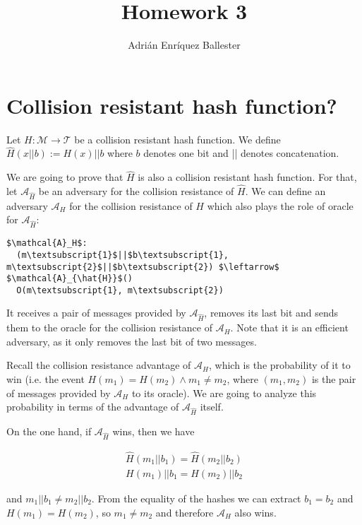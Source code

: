 \documentclass{article}
\title{Homework 3}
\author{Adrián Enríquez Ballester}
\begin{document}
\maketitle

\section{Collision resistant hash function?}

Let $H: \mathcal{M} \rightarrow \mathcal{T}$ be a collision resistant 
hash function. We define $\hat{H}(x||b) := H(x)||b$ where $b$ denotes
one bit and || denotes concatenation. 

We are going to prove that 
$\hat{H}$ is also a collision resistant hash function.
For that, let $\mathcal{A}_{\hat{H}}$ be an adversary for the 
collision resistance of $\hat{H}$. We can define an adversary $\mathcal{A}_H$
for the collision resistance of $H$ which also plays the role of 
oracle for $\mathcal{A}_{\hat{H}}$:

\begin{Verbatim}[commandchars=\\\{\},codes={\catcode`$=3\catcode`_=8}]
$\mathcal{A}_H$:
  (m\textsubscript{1}$||$b\textsubscript{1}, m\textsubscript{2}$||$b\textsubscript{2}) $\leftarrow$ $\mathcal{A}_{\hat{H}}$()
  O(m\textsubscript{1}, m\textsubscript{2})
\end{Verbatim}

It receives a pair of messages provided by 
$\mathcal{A}_{\hat{H}}$, removes its last bit and sends them to the
oracle for the collision resistance of $\mathcal{A}_H$. Note that
it is an efficient adversary, as it only removes the last bit of 
two messages.

Recall the collision resistance advantage of $\mathcal{A}_H$, which is 
the probability of it to win (i.e. the event 
$H(m_1) = H(m_2) \land m_1 \neq m_2$, where $(m_1, m_2)$ is the pair 
of messages provided by $\mathcal{A}_H$ to its oracle). We are going to 
analyze this probability in terms of the  advantage of 
$\mathcal{A}_{\hat{H}}$ itself.

On the one hand, if $\mathcal{A}_{\hat{H}}$ wins, then we have 

\begin{align*}
  \hat{H}(m_1||b_1) = \hat{H}(m_2||b_2) \\
  H(m_1)||b_1 = H(m_2)||b_2
\end{align*}

and $m_1||b_1 \neq m_2||b_2$. From the equality of the hashes
we can extract $b_1 = b_2$ and $H(m_1) = H(m_2)$, so
$m_1 \neq m_2$ and therefore $\mathcal{A}_H$ also wins.
\end{document}
